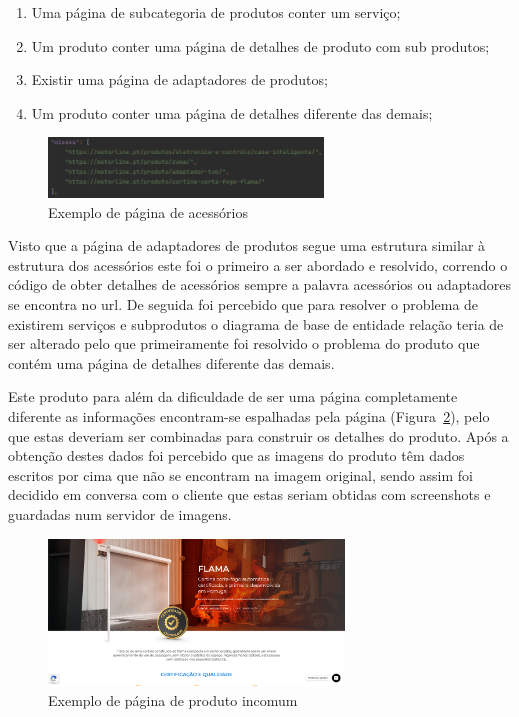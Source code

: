 \begin{enumerate}
    \item Uma página de subcategoria de produtos conter um serviço;
    \item Um produto conter uma página de detalhes de produto com sub produtos;
    \item Existir uma página de adaptadores de produtos;
    \item Um produto conter uma página de detalhes diferente das demais;
\end{enumerate}

\begin{figure}[htb]
    \centering
    
    \includegraphics[width=0.65\textwidth]{images/implementacao/scraper/melhor_corrida.png}
    \caption{Exemplo de página de acessórios}
    \label{fig:59}
\end{figure}



Visto que a página de adaptadores de produtos segue uma estrutura similar à estrutura dos acessórios este foi o primeiro a ser abordado e resolvido, correndo o código de obter detalhes de acessórios sempre a 
palavra acessórios ou adaptadores se encontra no url. De seguida foi percebido que para resolver o problema de existirem serviços e subprodutos o diagrama de base de entidade relação teria de ser alterado pelo que
primeiramente foi resolvido o problema do produto que contém uma página de detalhes diferente das demais. 

Este produto para além da dificuldade de ser uma página completamente diferente as informações encontram-se espalhadas pela página (Figura~\ref*{fig:60}), pelo que estas deveriam ser combinadas para construir os detalhes do produto.
Após a obtenção destes dados foi percebido que as imagens do produto têm dados escritos por cima que não se encontram na imagem original, sendo assim foi
decidido em conversa com o cliente que estas seriam obtidas com screenshots e guardadas num servidor de imagens.

\begin{figure}[htb]
    \centering
    \includegraphics[width=0.7\textwidth]{images/implementacao/scraper/flama.png}
    \caption{Exemplo de página de produto incomum}
    \label{fig:60}
\end{figure}


